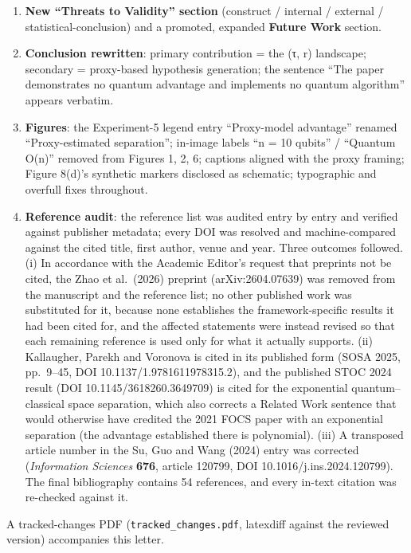 \documentclass[
  11pt,
]{article}
\begin{document}
\begin{enumerate}
  cannot predict --- including three \textbf{falsifiable hypotheses
  (H1--H3) with explicit refutation criteria}.
\item
  \textbf{New ``Threats to Validity'' section} (construct / internal /
  external / statistical-conclusion) and a promoted, expanded
  \textbf{Future Work} section.
\item
  \textbf{Conclusion rewritten}: primary contribution = the (τ, r)
  landscape; secondary = proxy-based hypothesis generation; the sentence
  ``The paper demonstrates no quantum advantage and implements no
  quantum algorithm'' appears verbatim.
\item
  \textbf{Figures}: the Experiment-5 legend entry ``Proxy-model
  advantage'' renamed ``Proxy-estimated separation''; in-image labels
  ``n = 10 qubits'' / ``Quantum O(n)'' removed from Figures 1, 2, 6;
  captions aligned with the proxy framing; Figure 8(d)'s synthetic
  markers disclosed as schematic; typographic and overfull fixes
  throughout.
\item
  \textbf{Reference audit}: the reference list was audited entry by
  entry and verified against publisher metadata; every DOI was resolved
  and machine-compared against the cited title, first author, venue and
  year. Three outcomes followed. (i) In accordance with the Academic
  Editor's request that preprints not be cited, the Zhao et al.~(2026)
  preprint (arXiv:2604.07639) was removed from the manuscript and the
  reference list; no other published work was substituted for it,
  because none establishes the framework-specific results it had been
  cited for, and the affected statements were instead revised so that
  each remaining reference is used only for what it actually supports.
  (ii) Kallaugher, Parekh and Voronova is cited in its published form
  (SOSA 2025, pp.~9--45, DOI 10.1137/1.9781611978315.2), and the
  published STOC 2024 result (DOI 10.1145/3618260.3649709) is cited for
  the exponential quantum--classical space separation, which also
  corrects a Related Work sentence that would otherwise have credited
  the 2021 FOCS paper with an exponential separation (the advantage
  established there is polynomial). (iii) A transposed article number in
  the Su, Guo and Wang (2024) entry was corrected (\emph{Information
  Sciences} \textbf{676}, article 120799, DOI
  10.1016/j.ins.2024.120799). The final bibliography contains 54
  references, and every in-text citation was re-checked against it.
\end{enumerate}

A tracked-changes PDF (\texttt{tracked\_changes.pdf}, latexdiff against
the reviewed version) accompanies this letter.
\end{document}

